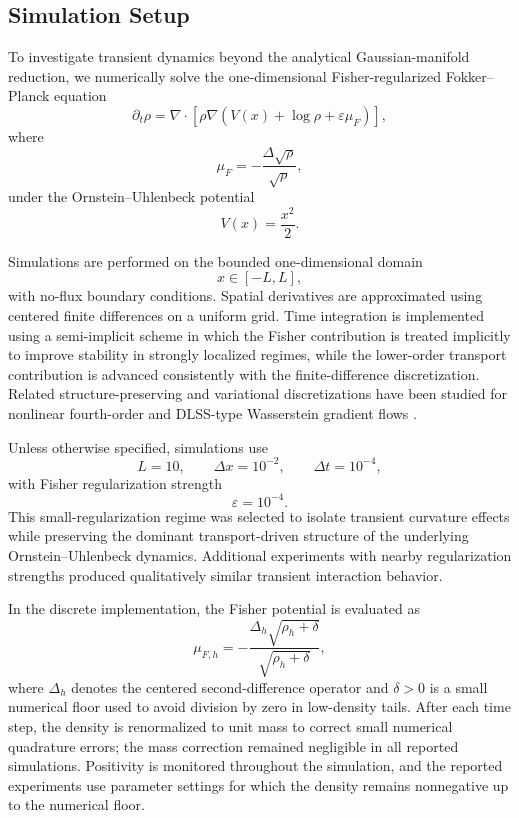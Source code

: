 \documentclass[aps,prl,twocolumn,10pt,superscriptaddress]{revtex4-2}
\begin{document}
\subsection{Simulation Setup}

To investigate transient dynamics beyond the analytical Gaussian-manifold reduction, we numerically solve the one-dimensional Fisher-regularized Fokker--Planck equation
\[
\partial_t\rho
=
\nabla\cdot
\left[
\rho
\nabla
\left(
V(x)+\log\rho+\varepsilon\mu_F
\right)
\right],
\]
where
\[
\mu_F
=
-
\frac{\Delta\sqrt{\rho}}{\sqrt{\rho}},
\]
under the Ornstein--Uhlenbeck potential
\[
V(x)=\frac{x^2}{2}.
\]

Simulations are performed on the bounded one-dimensional domain
\[
x\in[-L,L],
\]
with no-flux boundary conditions. Spatial derivatives are approximated using centered finite differences on a uniform grid. Time integration is implemented using a semi-implicit scheme in which the Fisher contribution is treated implicitly to improve stability in strongly localized regimes, while the lower-order transport contribution is advanced consistently with the finite-difference discretization. Related structure-preserving and variational discretizations have been studied for nonlinear fourth-order and DLSS-type Wasserstein gradient flows \cite{bukal2021well,during2010gradient}.

Unless otherwise specified, simulations use
\[
L=10,
\qquad
\Delta x = 10^{-2},
\qquad
\Delta t = 10^{-4},
\]
with Fisher regularization strength
\[
\varepsilon=10^{-4}.
\]
This small-regularization regime was selected to isolate transient curvature effects while preserving the dominant transport-driven structure of the underlying Ornstein--Uhlenbeck dynamics. Additional experiments with nearby regularization strengths produced qualitatively similar transient interaction behavior.

In the discrete implementation, the Fisher potential is evaluated as
\[
\mu_{F,h}
=
-
\frac{\Delta_h \sqrt{\rho_h+\delta}}
{\sqrt{\rho_h+\delta}},
\]
where $\Delta_h$ denotes the centered second-difference operator and $\delta>0$ is a small numerical floor used to avoid division by zero in low-density tails. After each time step, the density is renormalized to unit mass to correct small numerical quadrature errors; the mass correction remained negligible in all reported simulations. Positivity is monitored throughout the simulation, and the reported experiments use parameter settings for which the density remains nonnegative up to the numerical floor.
\end{document}
